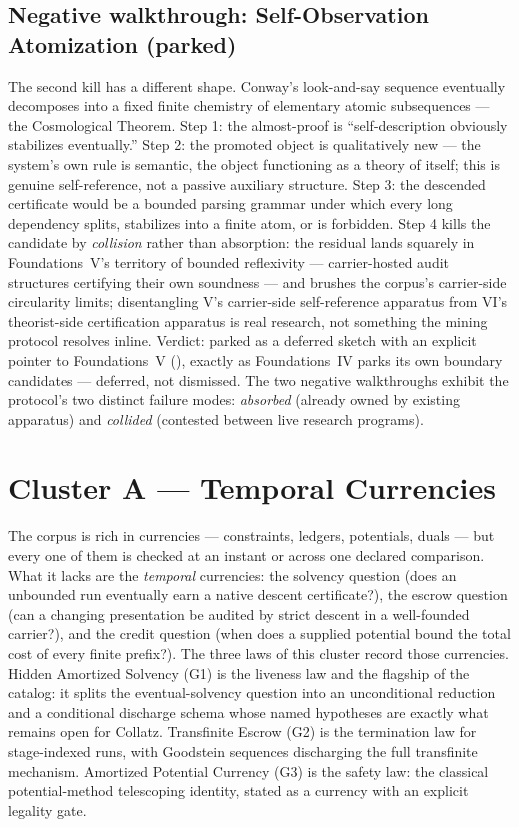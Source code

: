 \documentclass[11pt]{article}
\newcommand{\clusterA}{Temporal Currencies}
\newcommand{\FoundIV}{Foundations~IV}
\newcommand{\lawGOne}{Hidden Amortized Solvency}
\newcommand{\lawGTwo}{Transfinite Escrow}
\newcommand{\lawGThree}{Amortized Potential Currency}
\theoremstyle{definition}
\begin{document}
\subsection*{Negative walkthrough: Self-Observation Atomization (parked)}

The second kill has a different shape. Conway's look-and-say sequence eventually decomposes into a
fixed finite chemistry of elementary atomic subsequences --- the Cosmological Theorem. Step 1: the
almost-proof is ``self-description obviously stabilizes eventually.'' Step 2: the promoted object is
qualitatively new --- the system's own rule is semantic, the object functioning as a theory of
itself; this is genuine self-reference, not a passive auxiliary structure. Step 3: the descended
certificate would be a bounded parsing grammar under which every long dependency splits, stabilizes
into a finite atom, or is forbidden. Step 4 kills the candidate by \emph{collision} rather than
absorption: the residual lands squarely in Foundations~V's territory of bounded reflexivity ---
carrier-hosted audit structures certifying their own soundness \citep{FoundationsVCognition} ---
and brushes the corpus's carrier-side circularity limits; disentangling V's carrier-side
self-reference apparatus from VI's theorist-side certification apparatus is real research, not
something the mining protocol resolves inline. Verdict: parked as a deferred sketch with an explicit
pointer to Foundations~V (), exactly as \FoundIV{} parks its own boundary
candidates --- deferred, not dismissed. The two negative walkthroughs exhibit the protocol's two
distinct failure modes: \emph{absorbed} (already owned by existing apparatus) and \emph{collided}
(contested between live research programs).

 \section{Cluster A --- \clusterA}\label{sec:clusterA}

The corpus is rich in currencies --- constraints, ledgers, potentials, duals --- but every one of them
is checked at an instant or across one declared comparison. What it lacks are the \emph{temporal}
currencies: the solvency question (does an unbounded run eventually earn a native descent
certificate?), the escrow question (can a changing presentation be audited by strict descent in a
well-founded carrier?), and the credit question (when does a supplied potential bound the total cost of
every finite prefix?). The three laws of this cluster record those currencies. \lawGOne{} (G1) is the
liveness law and the flagship of the catalog: it splits the eventual-solvency question into an
unconditional reduction and a conditional discharge schema whose named hypotheses are exactly what
remains open for Collatz. \lawGTwo{} (G2) is the termination law for stage-indexed runs, with
Goodstein sequences discharging the full transfinite mechanism. \lawGThree{} (G3) is the safety law:
the classical potential-method telescoping identity, stated as a currency with an explicit legality
gate.
\end{document}
